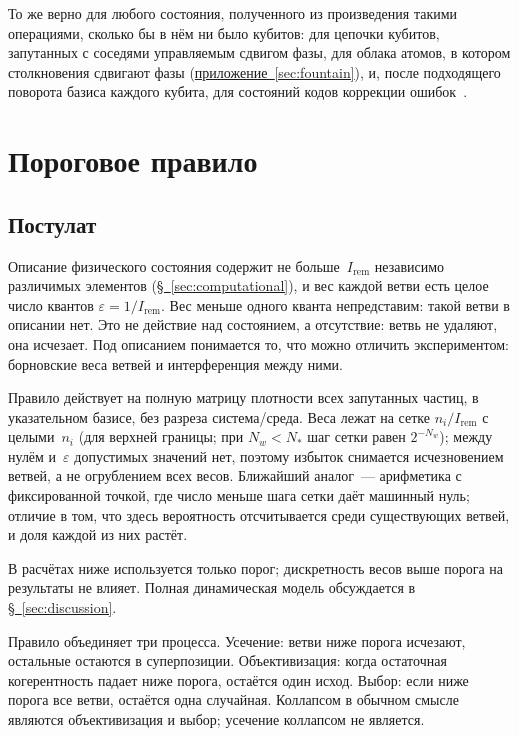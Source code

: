 \documentclass[11pt,a4paper]{article}
\newcommand{\Ost}{I_{\mathrm{rem}}}
\newcommand{\CollapseRule}{Пороговое правило}
\begin{document}
То же верно для любого состояния, полученного из произведения такими операциями, сколько бы в нём ни было кубитов: для цепочки кубитов, запутанных с соседями управляемым сдвигом фазы, для облака атомов, в котором столкновения сдвигают фазы (\hyperref[sec:fountain]{приложение~\ref*{sec:fountain}}), и, после подходящего поворота базиса каждого кубита, для состояний кодов коррекции ошибок~\cite{vandennest2004}.

\section{\CollapseRule}
\label{sec:rules}

\subsection{Постулат}
\label{sec:postulate}

Описание физического состояния содержит не больше~$\Ost$ независимо различимых элементов (\hyperref[sec:computational]{\S~\ref*{sec:computational}}), и вес каждой ветви есть целое число квантов $\varepsilon=1/\Ost$. Вес меньше одного кванта непредставим: такой ветви в описании нет. Это не действие над состоянием, а отсутствие: ветвь не удаляют, она исчезает. Под описанием понимается то, что можно отличить экспериментом: борновские веса ветвей и интерференция между ними.

Правило действует на полную матрицу плотности всех запутанных частиц, в указательном базисе, без разреза система/среда. Веса лежат на сетке $n_i/\Ost$ с целыми~$n_i$ (для верхней границы; при $N_w<N_*$ шаг сетки равен $2^{-N_w}$); между нулём и~$\varepsilon$ допустимых значений нет, поэтому избыток снимается исчезновением ветвей, а не огрублением всех весов. Ближайший аналог~--- арифметика с фиксированной точкой, где число меньше шага сетки даёт машинный нуль; отличие в том, что здесь вероятность отсчитывается среди существующих ветвей, и доля каждой из них растёт.

В расчётах ниже используется только порог; дискретность весов выше порога на результаты не влияет. Полная динамическая модель обсуждается в \hyperref[sec:discussion]{\S~\ref*{sec:discussion}}.

Правило объединяет три процесса. Усечение: ветви ниже порога исчезают, остальные остаются в суперпозиции. Объективизация: когда остаточная когерентность падает ниже порога, остаётся один исход. Выбор: если ниже порога все ветви, остаётся одна случайная. Коллапсом в обычном смысле являются объективизация и выбор; усечение коллапсом не является.
\end{document}
